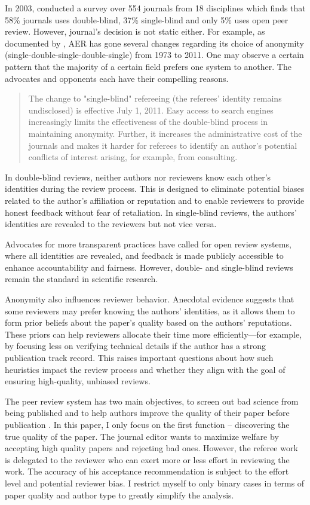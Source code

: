 \documentclass[12pt]{article}
\begin{document}
In 2003, \cite{bachand2003accuracy} conducted a survey over 554 journals from
18 disciplines which finds that 58\% journals uses double-blind, 37\%
single-blind and only 5\% uses open peer review. However, journal's decision is
not static either. For example, as documented by \citet{pontille2014blind}, AER
has gone several changes regarding its choice of anonymity
(single-double-single-double-single) from 1973 to 2011. One may observe a
certain pattern that the majority of a certain field prefers one system to
another. The advocates and opponents each have their compelling reasons.
\begin{quote}
    The change to "single-blind" refereeing (the referees' identity remains undisclosed) is
    effective July 1, 2011. Easy access to search engines increasingly limits the effectiveness of the double-blind process in
    maintaining anonymity. Further, it increases the administrative cost of the journals and makes it harder
    for referees to identify an author's potential conflicts of interest arising, for example, from consulting. \citet{AER2011}
\end{quote}
In double-blind reviews, neither authors nor reviewers know each other’s identities during the review process. This is designed to eliminate potential biases related to the author’s affiliation or reputation and to enable reviewers to provide honest feedback without fear of retaliation. In single-blind reviews, the authors’ identities are revealed to the reviewers but not vice versa.

Advocates for more transparent practices have called for open review systems,
where all identities are revealed, and feedback is made publicly accessible to
enhance accountability and fairness. However, double- and single-blind reviews
remain the standard in scientific research.

Anonymity also influences reviewer behavior. Anecdotal evidence suggests that
some reviewers may prefer knowing the authors’ identities, as it allows them to
form prior beliefs about the paper’s quality based on the authors’ reputations.
These priors can help reviewers allocate their time more efficiently—for
example, by focusing less on verifying technical details if the author has a
strong publication track record. This raises important questions about how such
heuristics impact the review process and whether they align with the goal of
ensuring high-quality, unbiased reviews.

The peer review system has two main objectives, to screen out bad science from
being published and to help authors improve the quality of their paper before
publication \citep{tan2018peer}. In this paper, I only focus on the first
function -- discovering the true quality of the paper. The journal editor wants
to maximize welfare by accepting high quality papers and rejecting bad ones.
However, the referee work is delegated to the reviewer who can exert more or
less effort in reviewing the work. The accuracy of his acceptance
recommendation is subject to the effort level and potential reviewer bias. I
restrict myself to only binary cases in terms of paper quality and author type
to greatly simplify the analysis.
\end{document}
